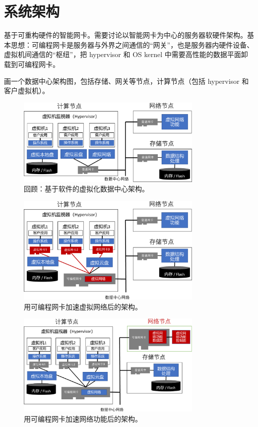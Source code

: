 \chapter{系统架构}

基于可重构硬件的智能网卡。需要讨论以智能网卡为中心的服务器软硬件架构。基本思想：可编程网卡是服务器与外界之间通信的“网关”，也是服务器内硬件设备、虚拟机间通信的“枢纽”，把 hypervisor 和 OS kernel 中需要高性能的数据平面卸载到可编程网卡。

画一个数据中心架构图，包括存储、网关等节点，计算节点（包括 hypervisor 和客户虚拟机）。


\begin{figure}[htbp]
	\centering
	\includegraphics[width=0.8\textwidth]{figures/virt_arch.pdf}
	\caption{回顾：基于软件的虚拟化数据中心架构。}
	\label{arch:fig:virt-architecture}
\end{figure}


\begin{figure}[htbp]
	\centering
	\includegraphics[width=0.8\textwidth]{figures/virtual_network.pdf}
	\caption{用可编程网卡加速虚拟网络后的架构。}
	\label{arch:fig:virtual-network}
\end{figure}

\begin{figure}[htbp]
	\centering
	\includegraphics[width=0.8\textwidth]{figures/NFV_accel.pdf}
	\caption{用可编程网卡加速网络功能后的架构。}
	\label{arch:fig:network-function}
\end{figure}


